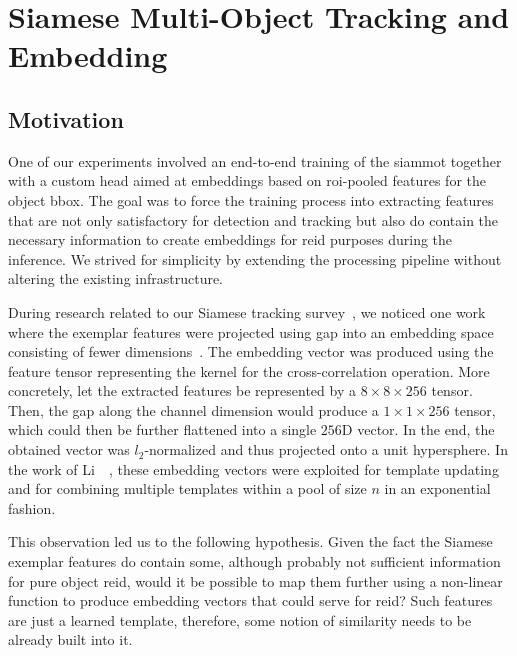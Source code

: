 \section{Siamese Multi-Object Tracking and Embedding}
\label{sec:SiamMOTandFeatureEmb}

\subsection{Motivation}

One of our experiments involved an end-to-end training of the \gls{siammot} together with a custom head aimed at embeddings based on \gls{roi}-pooled features for the object \gls{bbox}. The goal was to force the training process into extracting features that are not only satisfactory for detection and tracking but also do contain the necessary information to create embeddings for \gls{reid} purposes during the inference. We strived for simplicity by extending the processing pipeline without altering the existing infrastructure.

During research related to our Siamese tracking survey~\cite{ondrasovic2021siamese}, we noticed one work where the exemplar features were projected using \gls{gap} into an embedding space consisting of fewer dimensions~\cite{li2020figsiam}. The embedding vector was produced using the feature tensor representing the kernel for the cross-correlation operation. More concretely, let the extracted features be represented by a $8 \times 8 \times 256$ tensor. Then, the \gls{gap} along the channel dimension would produce a $1 \times 1 \times 256$ tensor, which could then be further flattened into a single $256$D vector. In the end, the obtained vector was $l_2$-normalized and thus projected onto a unit hypersphere. In the work of Li~\etal{}~\cite{li2020figsiam}, these embedding vectors were exploited for template updating and for combining multiple templates within a pool of size $n$ in an exponential fashion.

This observation led us to the following hypothesis. Given the fact the Siamese exemplar features do contain some, although probably not sufficient information for pure object \gls{reid}, would it be possible to map them further using a non-linear function to produce embedding vectors that could serve for \gls{reid}? Such features are just a learned template, therefore, some notion of similarity needs to be already built into it.

